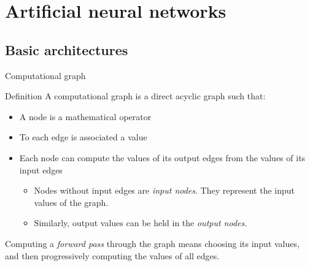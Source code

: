 \documentclass[xcolor=pdftex,dvipsnames,table,mathserif]{beamer}
\begin{document}
\section{Artificial neural networks}

\subsection{Basic architectures}

\begin{frame}{Computational graph}

  \begin{block}{Definition}
    A computational graph is a direct acyclic graph such that:
    \begin{itemize}
    \item A node is a mathematical operator
    \item To each edge is associated a value
    \item Each node can compute the values of its output edges from the values of its input edges
      \begin{itemize}
      \item Nodes without input edges are \emph{input nodes}. They represent the input values of the graph.
      \item Similarly, output values can be held in the \emph{output nodes}.
      \end{itemize}
    \end{itemize}
  \end{block}

  Computing a \emph{forward pass} through the graph means choosing its input values, and then progressively computing the values of all edges.


\end{frame}
\end{document}
